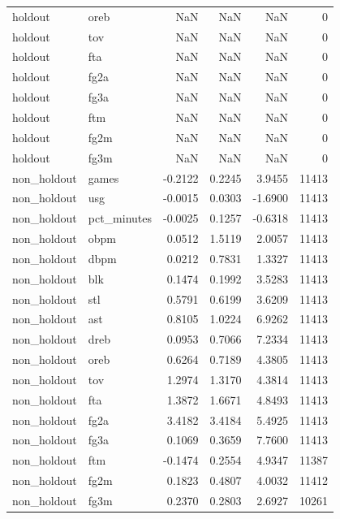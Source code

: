 \begin{table}
\begin{tabular}{llrrrr}
holdout & oreb & NaN & NaN & NaN & 0 \\
holdout & tov & NaN & NaN & NaN & 0 \\
holdout & fta & NaN & NaN & NaN & 0 \\
holdout & fg2a & NaN & NaN & NaN & 0 \\
holdout & fg3a & NaN & NaN & NaN & 0 \\
holdout & ftm & NaN & NaN & NaN & 0 \\
holdout & fg2m & NaN & NaN & NaN & 0 \\
holdout & fg3m & NaN & NaN & NaN & 0 \\
non\_holdout & games & -0.2122 & 0.2245 & 3.9455 & 11413 \\
non\_holdout & usg & -0.0015 & 0.0303 & -1.6900 & 11413 \\
non\_holdout & pct\_minutes & -0.0025 & 0.1257 & -0.6318 & 11413 \\
non\_holdout & obpm & 0.0512 & 1.5119 & 2.0057 & 11413 \\
non\_holdout & dbpm & 0.0212 & 0.7831 & 1.3327 & 11413 \\
non\_holdout & blk & 0.1474 & 0.1992 & 3.5283 & 11413 \\
non\_holdout & stl & 0.5791 & 0.6199 & 3.6209 & 11413 \\
non\_holdout & ast & 0.8105 & 1.0224 & 6.9262 & 11413 \\
non\_holdout & dreb & 0.0953 & 0.7066 & 7.2334 & 11413 \\
non\_holdout & oreb & 0.6264 & 0.7189 & 4.3805 & 11413 \\
non\_holdout & tov & 1.2974 & 1.3170 & 4.3814 & 11413 \\
non\_holdout & fta & 1.3872 & 1.6671 & 4.8493 & 11413 \\
non\_holdout & fg2a & 3.4182 & 3.4184 & 5.4925 & 11413 \\
non\_holdout & fg3a & 0.1069 & 0.3659 & 7.7600 & 11413 \\
non\_holdout & ftm & -0.1474 & 0.2554 & 4.9347 & 11387 \\
non\_holdout & fg2m & 0.1823 & 0.4807 & 4.0032 & 11412 \\
non\_holdout & fg3m & 0.2370 & 0.2803 & 2.6927 & 10261 \\
\bottomrule
\end{tabular}
\end{table}
